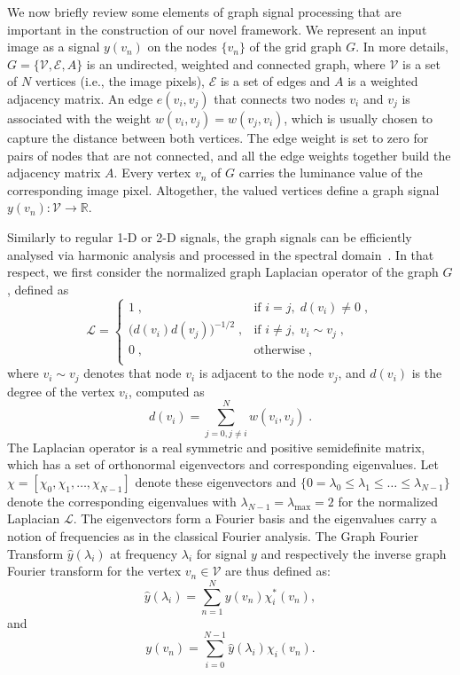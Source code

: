 \documentclass[10pt,journal,compsoc]{IEEEtran}
\begin{document}
	We now briefly review some elements of graph signal processing that are important in the construction of our novel framework. We represent an input image as a signal $y(v_n)$ on the nodes $\{v_n\}$ of the grid graph $G$. In more details, $G=\{{\mathcal{V},\mathcal{E}}, A\}$ is an undirected, weighted and connected graph, where $\mathcal{V}$ is a set of $N$ vertices (i.e., the image pixels), $\mathcal{E}$ is a set of edges and $A$ is a weighted adjacency matrix. An edge $e(v_i,v_j)$ that connects two nodes $v_i$ and $v_j$ is associated with the weight $w(v_i, v_j)=w(v_j, v_i)$, which is usually chosen to capture the distance between both vertices. The edge weight is set to zero for pairs of nodes that are not connected, and all the edge weights together build the adjacency matrix $A$. Every vertex $v_n$ of $G$ carries the luminance value of the corresponding image pixel. Altogether, the valued vertices define a graph signal $y(v_n): \mathcal{V} \to \mathbb{R}$. 
	
	Similarly to regular 1-D or 2-D signals, the graph signals can be efficiently analysed via harmonic analysis and processed in the spectral domain~\cite{bb:shuman2013emerging}. In that respect, we first consider the normalized graph Laplacian operator of the graph $G$, defined as 
			\begin{equation}
	\mathcal{L} =
	\begin{cases}
	1\;,  & \mbox{if } i = j, \; d(v_i) \neq 0 \;, \\
	\big(d(v_i) d(v_j)\big)^{-1/2}\;, &  \mbox{if } i \neq j, \; v_i \sim v_j \;, \\
	0\;, &  \mbox{otherwise}\;, \\
	\end{cases}
	\label{eq:laplacian}
	\end{equation} 
	\noindent
	where $v_i \sim v_j$ denotes that node $v_i$ is adjacent to the node $v_j$, and $d(v_i)$ is the degree of the vertex $v_i$, computed as 
	\begin{equation}
	d(v_i) = \sum_{j=0, j \neq i}^N w(v_i, v_j)\;.
	\end{equation}
	The Laplacian operator is a real symmetric and positive semidefinite matrix, which has a set of orthonormal eigenvectors and corresponding eigenvalues. Let $\chi=[\chi_0, \chi_1, \dots, \chi_{N-1}]$ denote these eigenvectors and $\{0=\lambda_0 \leq \lambda_1\leq \dots \leq \lambda_{N-1} \}$ denote the corresponding eigenvalues with $\lambda_{N-1} = \lambda_{\mathrm{max}} = 2$ for the normalized Laplacian $\mathcal{L}$. The eigenvectors form a Fourier basis and the eigenvalues carry a notion of frequencies as in the classical Fourier analysis. The Graph Fourier Transform $\hat{y}(\lambda_i)$ at frequency $\lambda_i$ for signal $y$ and respectively the inverse graph Fourier transform for the vertex $v_n \in \mathcal{V}$ are thus defined as:
	\begin{equation}
	\hat{y}(\lambda_i) = \sum_{n=1}^{N} y(v_n) \chi_i^*(v_n),
	\end{equation}
	and 
	\begin{equation}
	y(v_n) = \sum_{i=0}^{N-1} \hat{y}(\lambda_i) \chi_i(v_n).
	\end{equation}
	\noindent
	
\end{document}
